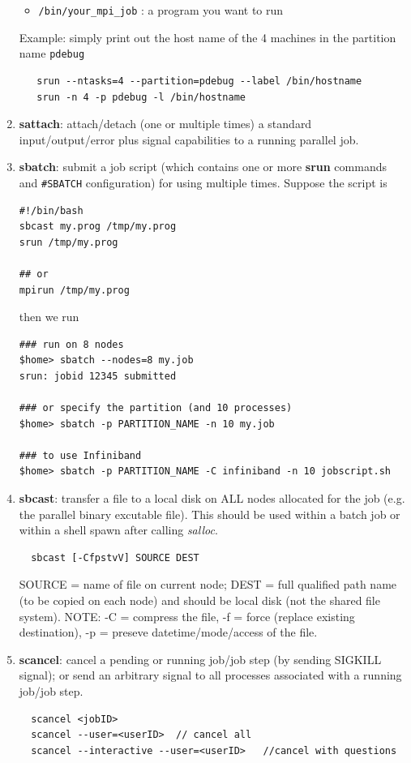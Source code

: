 \begin{enumerate}
\begin{itemize}
     \item \verb!/bin/your_mpi_job! : a program you want to run
   \end{itemize}
   Example: simply print out the host name of the 4 machines in the partition
   name \verb!pdebug!
   \begin{verbatim}
   srun --ntasks=4 --partition=pdebug --label /bin/hostname
   srun -n 4 -p pdebug -l /bin/hostname
   \end{verbatim}
     
  \item {\bf sattach}: attach/detach (one or multiple times) a standard
  input/output/error plus signal capabilities to a running parallel job.
  
  \item {\bf sbatch}: submit a job script (which contains one or more {\bf
  srun} commands and \verb!#SBATCH! configuration) for using multiple
  times.  Suppose the script is
  \begin{verbatim}
#!/bin/bash
sbcast my.prog /tmp/my.prog
srun /tmp/my.prog

## or
mpirun /tmp/my.prog 
  \end{verbatim}
then we run
\begin{verbatim}
### run on 8 nodes
$home> sbatch --nodes=8 my.job
srun: jobid 12345 submitted

### or specify the partition (and 10 processes)
$home> sbatch -p PARTITION_NAME -n 10 my.job

### to use Infiniband
$home> sbatch -p PARTITION_NAME -C infiniband -n 10 jobscript.sh
\end{verbatim}  


  \item {\bf sbcast}: transfer a file to a local disk on ALL nodes
  allocated for the job (e.g. the parallel binary excutable file). This should
  be used within a batch job or within a shell spawn after calling {\it salloc}. 
  \begin{verbatim}
  sbcast [-CfpstvV] SOURCE DEST
  \end{verbatim}
  SOURCE = name of file on current node; DEST = full qualified path name (to be
  copied on each node) and should be local disk (not the shared file system). 
  NOTE: -C = compress the file, -f = force (replace existing destination), -p =
  preseve datetime/mode/access of the file.
    
  \item {\bf scancel}: cancel a pending or running job/job step (by sending
  SIGKILL signal); or send an arbitrary signal to all processes associated with
  a running job/job step.
  \begin{verbatim}
  scancel <jobID>
  scancel --user=<userID>  // cancel all 
  scancel --interactive --user=<userID>   //cancel with questions
  \end{verbatim}
\end{enumerate}

